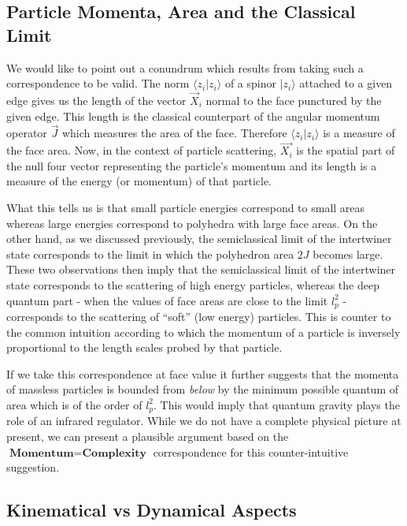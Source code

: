 \documentclass[twocolumn,final,aps,nofootinbib,nobibnotes]{revtex4-2}
\newcommand{\innerp}[2]{\langle #1 \vert #2 \rangle}
\newcommand{\ket}[1]{\vert #1 \rangle}
\begin{document}
\subsection{Particle Momenta, Area and the Classical Limit}\label{sec:momenta-area}

We would like to point out a conundrum which results from taking such a correspondence to be valid. The norm $ \innerp{z_i}{z_i} $ of a spinor $ \ket{z_i} $ attached to a given edge gives us the length of the vector $ \vec X_i $ normal to the face punctured by the given edge. This length is the classical counterpart of the angular momentum operator $ \vec{J} $ which measures the area of the face. Therefore $ \innerp{z_i}{z_i} $ is a measure of the face area. Now, in the context of particle scattering, $ \vec{X_i} $ is the spatial part of the null four vector representing the particle's momentum and its length is a measure of the energy (or momentum) of that particle.

What this tells us is that small particle energies correspond to small areas whereas large energies correspond to polyhedra with large face areas. On the other hand, as we discussed previously, the semiclassical limit of the intertwiner state corresponds to the limit in which the polyhedron area $ 2J $ becomes large. These two observations then imply that the semiclassical limit of the intertwiner state corresponds to the scattering of high energy particles, whereas the deep quantum part - when the values of face areas are close to the limit $ l_p^2 $ - corresponds to the scattering of ``soft'' (low energy) particles. This is counter to the common intuition according to which the momentum of a particle is inversely proportional to the length scales probed by that particle.

If we take this correspondence at face value it further suggests that the momenta of massless particles is bounded from \textit{below} by the minimum possible quantum of area which is of the order of $ l_p^2 $. This would imply that quantum gravity plays the role of an infrared regulator. While we do not have a complete physical picture at present, we can present a plausible argument based on the $ \textbf{Momentum} = \textbf{Complexity} $ correspondence for this counter-intuitive suggestion.

\subsection{Kinematical vs Dynamical Aspects}\label{sec:kin-vs-dyn}
\end{document}
